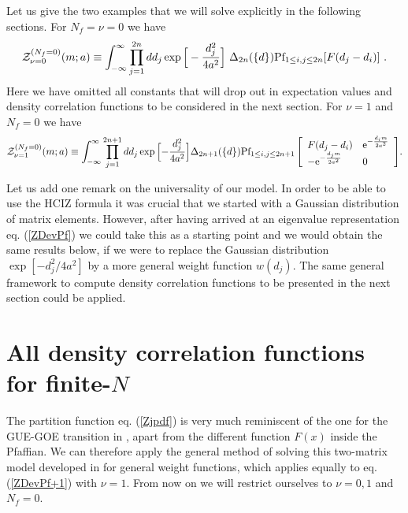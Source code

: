 \documentclass[11pt]{article}
\newcommand{\bea}{\begin{eqnarray}}
\newcommand{\eea}{\end{eqnarray}}
\newcommand{\e}{\mbox{e}}
\newcommand{\sect}[1]{\setcounter{equation}{0}\section{#1}}
\def\Pf{\mbox{Pf}}
\begin{document}
Let us give the two examples that we will solve explicitly in the
following sections. For $N_f=\nu=0$ we have
\bea
{\cal Z}_{\nu=0}^{(N_f=0)}(m;a)
\equiv
\int_{-\infty}^\infty\prod_{j=1}^{2n}
dd_j \exp\Big[-\frac{d_j^2}{4a^2}\Big]
\ \Delta_{2n}(\{d\})\Pf_{1\leq i,j\leq 2n}[F(d_j-d_i)]\ .
\label{Zjpdf}
\eea
Here we have omitted all constants that will drop out in expectation
values and density correlation functions to be considered in the next section.
For $\nu=1$ and $N_f=0$ we have
\bea
\label{ZDevPf+1}
{\cal Z}_{\nu=1}^{(N_f=0)}(m;a)
\equiv
\int_{-\infty}^\infty\prod_{j=1}^{2n+1}
dd_j
\exp\Big[{-\frac{d_j^2}{4a^2}}\Big]
\Delta_{2n+1}(\{d\})
\Pf_{1\leq i,j\leq 2n+1}
\left[
\begin{array}{ll}
F(d_j-d_i)& \e^{-\frac{d_i m}{2a^2}}\\
-\e^{-\frac{d_j m}{2a^2}}  & 0\\
\end{array}
\right]\!.
\eea

Let us add one remark on the universality of our model. In order to be
able to use the HCIZ formula it was crucial that we started with a
Gaussian distribution of matrix elements. However, after having arrived
at an eigenvalue representation eq. (\ref{ZDevPf}) we could take this
as a starting point and we would obtain the same results below,
if we were to replace the Gaussian distribution $\exp[-d_j^2/4a^2]$ by a
more general weight function $w(d_j)$. The same general framework to compute
density correlation functions to be presented in the next section
could be applied. 





\sect{All density correlation functions for finite-$N$}\label{Rk}


The partition function eq. (\ref{Zjpdf}) is very much reminiscent of the one
for the GUE-GOE transition in \cite{PandeyMehta}, apart from the
different function $F(x)$ inside the Pfaffian. We can therefore apply
the general method of solving this two-matrix model developed in
\cite{NF98} for general weight functions, which applies equally to
eq. (\ref{ZDevPf+1}) with $\nu=1$. From now on we will restrict
ourselves to $\nu=0,1$ and $N_f=0$.
\end{document}
